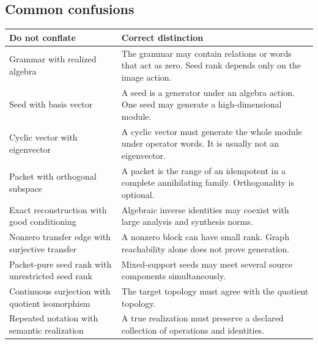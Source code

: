 \documentclass[11pt]{article}
\theoremstyle{definition}
\theoremstyle{remark}
\theoremstyle{definition}\newtheorem{example}[theorem]{Example}
\begin{document}
\subsection{Common confusions}
\begin{center}
\begin{longtable}{@{}>{\raggedright\arraybackslash}p{}>{\raggedright\arraybackslash}p{}@{}}
\toprule
\textbf{Do not conflate} & \textbf{Correct distinction}\\
\midrule
\endhead
Grammar with realized algebra & The grammar may contain relations or words that act as zero.  Seed rank depends only on the image action.\\
Seed with basis vector & A seed is a generator under an algebra action.  One seed may generate a high-dimensional module.\\
Cyclic vector with eigenvector & A cyclic vector must generate the whole module under operator words.  It is usually not an eigenvector.\\
Packet with orthogonal subspace & A packet is the range of an idempotent in a complete annihilating family.  Orthogonality is optional.\\
Exact reconstruction with good conditioning & Algebraic inverse identities may coexist with large analysis and synthesis norms.\\
Nonzero transfer edge with surjective transfer & A nonzero block can have small rank.  Graph reachability alone does not prove generation.\\
Packet-pure seed rank with unrestricted seed rank & Mixed-support seeds may meet several source components simultaneously.\\
Continuous surjection with quotient isomorphism & The target topology must agree with the quotient topology.\\
Repeated notation with semantic realization & A true realization must preserve a declared collection of operations and identities.\\
\bottomrule
\end{longtable}
\end{center}
\end{document}
